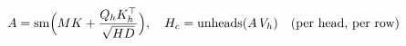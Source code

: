 \documentclass{article}
\begin{document}
\begin{preview}
$\displaystyle A = \mathrm{sm}\Bigl(MK + \frac{Q_h K_h^{\top}}{\sqrt{HD}}\Bigr),\quad H_c = \mathrm{unheads}(A\,V_h)\quad\text{(per head, per row)}$
\end{preview}
\end{document}

